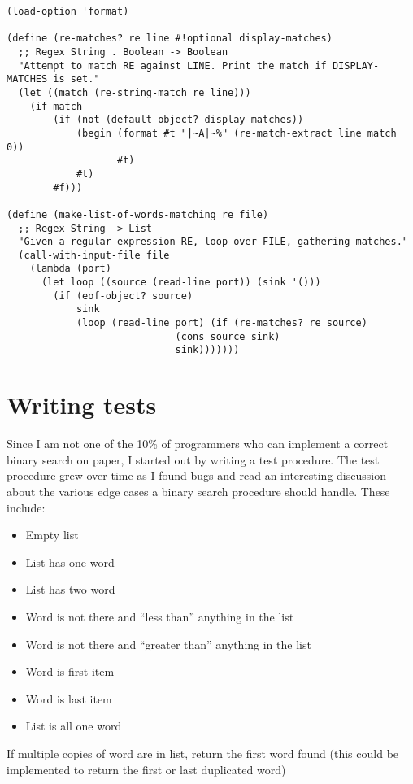 \documentclass[12pt,openright,draft]{book}
\begin{document}
\begin{verbatim}
(load-option 'format)

(define (re-matches? re line #!optional display-matches)
  ;; Regex String . Boolean -> Boolean
  "Attempt to match RE against LINE. Print the match if DISPLAY-MATCHES is set."
  (let ((match (re-string-match re line)))
    (if match
        (if (not (default-object? display-matches))
            (begin (format #t "|~A|~%" (re-match-extract line match 0))
                   #t)
            #t)
        #f)))

(define (make-list-of-words-matching re file)
  ;; Regex String -> List
  "Given a regular expression RE, loop over FILE, gathering matches."
  (call-with-input-file file
    (lambda (port)
      (let loop ((source (read-line port)) (sink '()))
        (if (eof-object? source)
            sink
            (loop (read-line port) (if (re-matches? re source)
                             (cons source sink)
                             sink)))))))

\end{verbatim}

\section{Writing tests}

Since I am not one of the 10\% of programmers who can implement a correct binary search on paper, I started out by writing a test procedure. The test procedure grew over time as I found bugs and read an interesting discussion about the various edge cases a binary search procedure should handle. These include: 

\begin{itemize}
\item Empty list 
\item List has one word 
\item List has two word 
\item Word is not there and ``less than'' anything in the list 
\item Word is not there and ``greater than'' anything in the list 
\item Word is first item 
\item Word is last item 
\item List is all one word 
\end{itemize}

If multiple copies of word are in list, return the first word found (this could be implemented to return the first or last duplicated word) 
\end{document}
